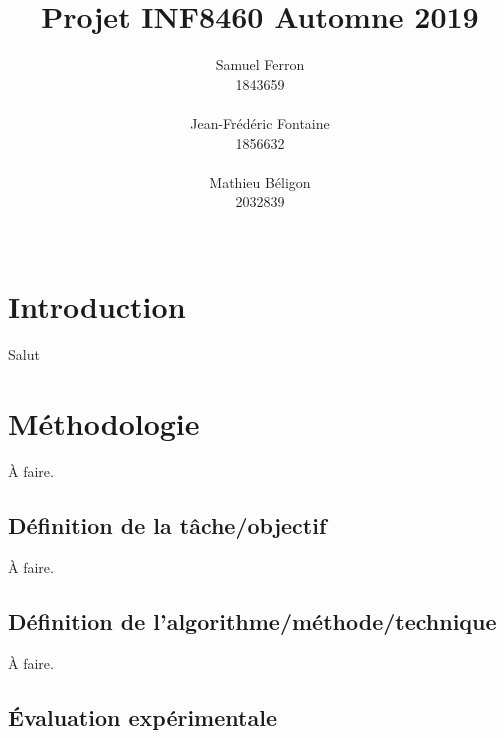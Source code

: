 \documentclass[11pt,a4paper, french]{article}
\title{Projet INF8460 Automne 2019 }
\author{Samuel Ferron \\
  1843659 \\
  {\tt } \\\And
  Jean-Frédéric Fontaine \\
  1856632 \\
  {\tt} \\\And
  Mathieu B\'eligon \\
  2032839\\
  {\tt } \\}
\date{}
\begin{document}
\maketitle

\section{Introduction}

Salut

%

\section{Méthodologie}

À faire. 

\subsection{Définition de la tâche/objectif}
À faire. 

\subsection{Définition de l'algorithme/méthode/technique}
À faire.

\subsection{Évaluation expérimentale }
\end{document}
